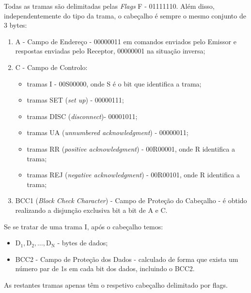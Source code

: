 \documentclass[11pt,a4paper,reqno]{report}
\numberwithin{equation}{section}
\begin{document}
\begin{appendices}
Todas as tramas são delimitadas pelas \emph{Flags} F - 01111110. Além disso, independentemente do tipo da trama, o cabeçalho é sempre o mesmo conjunto de 3 bytes:
\begin{enumerate}
	\item A - Campo de Endereço - 00000011 em comandos enviados pelo Emissor e respostas enviadas pelo Receptor, 00000001 na situação inversa;
	\item C - Campo de Controlo:
		\begin{itemize}
			\item tramas I - 00S00000, onde S é o bit que identifica a trama;
			\item tramas SET (\emph{set up}) - 00000111;
			\item tramas DISC (\emph{disconnect})- 00001011;
			\item tramas UA (\emph{unnumbered acknowledgment}) - 00000011;
			\item tramas RR (\emph{positive acknowledgment}) - 00R00001, onde R identifica a trama;
			\item tramas REJ (\emph{negative acknowledgment}) - 00R00101, onde R identifica a trama;
		\end{itemize}
	\item BCC1 (\emph{Block Check Character}) - Campo de Proteção do Cabeçalho - é obtido realizando a disjunção exclusiva bit a bit de A e C.
\end{enumerate} 

Se se tratar de uma trama I, após o cabeçalho temos:
\begin{itemize}
	\item $\text{D}_{\text{1}}, \text{D}_{\text{2}}, \ldots, \text{D}_{\text{N}}$ - bytes de dados;
	\item BCC2 - Campo de Proteção dos Dados - calculado de forma que exista um número par de 1s em cada bit dos dados, incluindo o BCC2.
\end{itemize}

As restantes tramas apenas têm o respetivo cabeçalho delimitado por flags.



\end{appendices}
\end{document}
